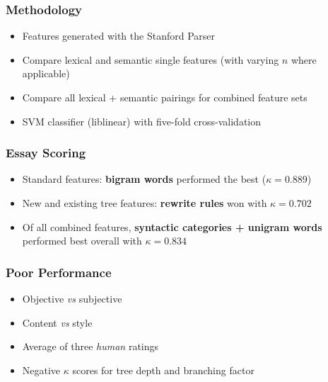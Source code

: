 \documentclass[handouti]{beamer}
\begin{document}
\begin{frame}
    \frametitle{Methodology}
    \begin{itemize}
        \itemsep1.5em
        \item Features generated with the Stanford Parser
        \item Compare lexical and semantic single features (with varying $n$
            where applicable)
        \item Compare all lexical + semantic pairings for combined feature sets
        \item SVM classifier (liblinear) with five-fold cross-validation
    \end{itemize}
\end{frame}

%

\begin{frame}
    \frametitle{Essay Scoring}
    \begin{itemize}
        \itemsep1.5em
        \item Standard features: \textbf{bigram words} performed the best
            ($\kappa=0.889$)

        \item New and existing tree features: \textbf{rewrite rules} won with
            $\kappa=0.702$

        \item Of all combined features, \textbf{syntactic categories + unigram
            words} performed best overall with $\kappa=0.834$
    \end{itemize}
\end{frame}

\begin{frame}
    \frametitle{Poor Performance}
    \begin{itemize}
        \itemsep1.5em
        \item Objective \emph{vs} subjective
        \item Content \emph{vs} style
        \item Average of three \emph{human} ratings
        \item Negative $\kappa$ scores for tree depth and branching factor
    \end{itemize}
\end{frame}
\end{document}
